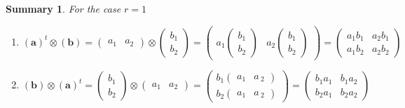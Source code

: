 \documentclass[aps,preprint]{revtex4}
\newtheorem{summary}[theorem]{Summary}
\begin{document}
\begin{summary}
For the case $r=1$

\begin{enumerate}
\item 
\begin{equation}
\left( \boldsymbol{a}\right) ^{t}\otimes \left( \boldsymbol{b}\right)
=\left( 
\begin{array}{cc}
a_{1} & a_{2}%
\end{array}%
\right) \otimes \left( 
\begin{array}{c}
b_{1} \\ 
b_{2}%
\end{array}%
\right) =\left( 
\begin{array}{cc}
a_{1}\left( 
\begin{array}{c}
b_{1} \\ 
b_{2}%
\end{array}%
\right) & a_{2}\left( 
\begin{array}{c}
b_{1} \\ 
b_{2}%
\end{array}%
\right)%
\end{array}%
\right) =\left( 
\begin{array}{cc}
a_{1}b_{1} & a_{2}b_{1} \\ 
a_{1}b_{2} & a_{2}b_{2}%
\end{array}%
\right)
\end{equation}

\item 
\begin{equation}
\left( \boldsymbol{b}\right) \otimes \left( \boldsymbol{a}\right)
^{t}=\left( 
\begin{array}{c}
b_{1} \\ 
b_{2}%
\end{array}%
\right) \otimes \left( 
\begin{array}{cc}
a_{1} & a_{2}%
\end{array}%
\right) =\left( 
\begin{array}{c}
b_{1}\left( 
\begin{array}{cc}
a_{1} & a_{\ 2}%
\end{array}%
\right) \\ 
b_{2}\left( 
\begin{array}{cc}
a_{1} & a_{\ 2}%
\end{array}%
\right)%
\end{array}%
\right) =\left( 
\begin{array}{cc}
b_{1}a_{1} & b_{1}a_{2} \\ 
b_{2}a_{1} & b_{2}a_{2}%
\end{array}%
\right)
\end{equation}
\end{enumerate}
\end{summary}
\end{document}
